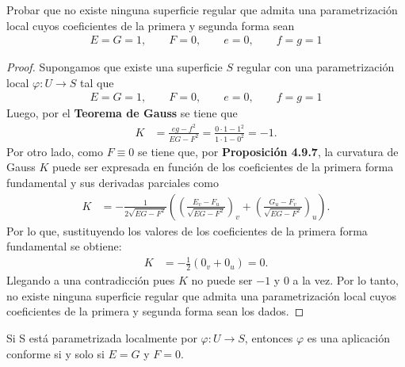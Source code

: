 \documentclass{article}
\newenvironment{theorem}[2][Ejercicio]{\begin{trivlist}
\item[\hskip \labelsep {\bfseries #1}\hskip \labelsep {\bfseries #2.}]}{\end{trivlist}}
\begin{document}
\vspace{1em}

\begin{theorem}{11}
    Probar que no existe ninguna superficie regular que admita una parametrización local cuyos coeficientes de la primera y segunda forma sean \begin{align*}
        E = G = 1, \qquad F = 0, \qquad e = 0, \qquad f = g = 1
    \end{align*}
\end{theorem}

\begin{proof}
    Supongamos que existe una superficie \( S \) regular con una parametrización local \( \varphi : U \to S \) tal que \begin{align*}
        E = G = 1, \qquad F = 0, \qquad e = 0, \qquad f = g = 1
    \end{align*}
    Luego, por el \textbf{Teorema de Gauss} se tiene que \begin{align*}
        K & = \frac{eg - f^2}{EG - F^2} = \frac{0 \cdot 1 - 1^2}{1 \cdot 1 - 0^2} = -1.
    \end{align*}
    Por otro lado, como \( F \equiv 0 \) se tiene que, por \textbf{Proposición 4.9.7}, la curvatura de Gauss \( K \) puede ser expresada en función de los coeficientes de la primera forma fundamental y sus derivadas parciales como \begin{align*}
        K & = -\frac{1}{2 \sqrt{EG - F^2}} \left( {\left( \frac{E_v - F_u}{\sqrt{EG - F^2}} \right)}_v + {\left( \frac{G_u - F_v}{\sqrt{EG - F^2}} \right)}_u \right).
    \end{align*}
    Por lo que, sustituyendo los valores de los coeficientes de la primera forma fundamental se obtiene: \begin{align*}
        K & = -\frac{1}{2} \left( 0_v + 0_u \right) = 0.
    \end{align*}
    Llegando a una contradicción pues \( K \) no puede ser \( -1 \) y \( 0 \) a la vez. Por lo tanto, no existe ninguna superficie regular que admita una parametrización local cuyos coeficientes de la primera y segunda forma sean los dados.
\end{proof}

\vspace{1em}

\begin{theorem}{12}
    Si S está parametrizada localmente por \( \varphi : U \to S \), entonces \( \varphi \) es una
    aplicación conforme si y solo si \( E = G \) y \( F = 0 \).
\end{theorem}
\end{document}
